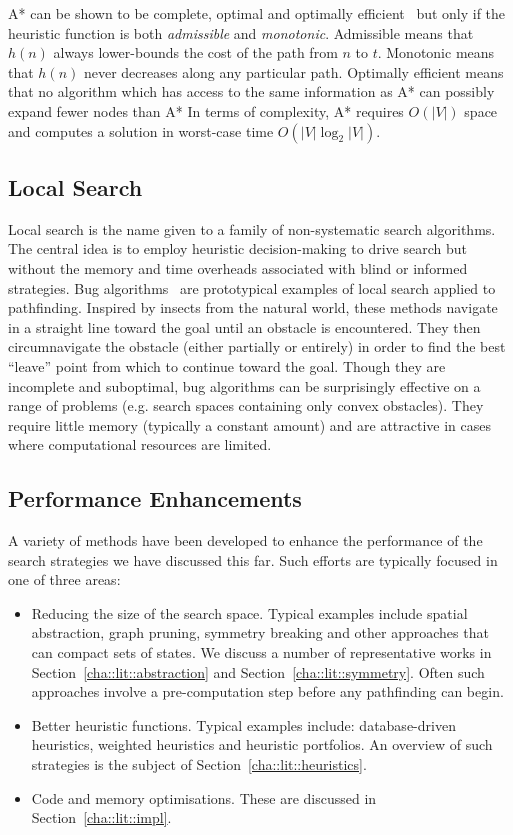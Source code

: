 A{*} can be shown to be complete, optimal and optimally
efficient~\citep{dechter85} but only if the heuristic function is both
\emph{admissible} and \emph{monotonic}. Admissible means that $h(n)$ always
lower-bounds the cost of the path from $n$ to $t$. Monotonic means that $h(n)$
never decreases along any particular path. Optimally efficient means that no
algorithm which has access to the same information as A{*} can possibly
expand fewer nodes than A{*}
In terms of complexity, A{*} requires $O(|V|)$ space and computes a solution in 
worst-case time $O(|V|\log_2{|V|})$.

\subsection{Local Search}
\label{cha::lit::search::local}
Local search is the name given to a family of non-systematic search algorithms.
The central idea is to employ heuristic decision-making to drive search but 
without the memory and time overheads associated with blind or informed strategies.
Bug algorithms~\citep{choset05} are prototypical examples of local search
applied to pathfinding.
Inspired by insects from the natural world, these methods navigate in a straight 
line toward the goal until an obstacle is encountered. They then circumnavigate 
the obstacle (either partially or entirely) in order to find the best ``leave'' 
point from which to continue toward the goal.
Though they are incomplete and suboptimal, bug algorithms can be surprisingly
effective on a range of problems (e.g. search spaces containing only convex
obstacles). They require little memory (typically a constant amount) and
are attractive in cases where computational resources are limited.

\subsection{Performance Enhancements}
\label{cha::lit::search::impl}
A variety of methods have been developed to enhance the performance of the
search strategies we have discussed this far. Such efforts are typically focused
in one of three areas:

\begin{itemize}
\item Reducing the size of the search space.
Typical examples include spatial abstraction, graph pruning, 
symmetry breaking and other approaches that can compact sets of states.
We discuss a number of representative works in Section~\ref{cha::lit::abstraction}
and Section~\ref{cha::lit::symmetry}. Often such approaches involve a 
pre-computation step before any pathfinding can begin.

\item Better heuristic functions.
Typical examples include: database-driven heuristics, weighted heuristics and 
heuristic portfolios. An overview of such strategies is the subject of 
Section~\ref{cha::lit::heuristics}.

\item Code and memory optimisations. These are discussed in 
Section~\ref{cha::lit::impl}.
\end{itemize}

